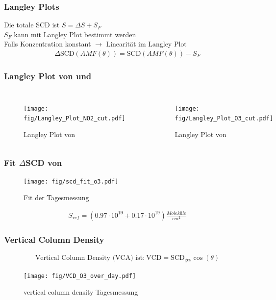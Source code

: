 \documentclass{beamer}
\begin{document}
\begin{frame}
    \frametitle{Langley Plots}
    Die totale SCD ist $S = \Delta S + S_F$\\
    $S_F$ kann mit Langley Plot bestimmt werden\\
    Falls Konzentration konstant $\to$ Linearität im Langley Plot
    \begin{align}
    	\Delta \text{SCD}(AMF(\theta)) = \text{SCD}(AMF(\theta)) - S_F
    \end{align}
\end{frame}

\begin{frame}
    \frametitle{Langley Plot von  und }
    \begin{columns}
        \begin{figure}
    		\texttt{[image: fig/Langley\_Plot\_NO2\_cut.pdf]}
            \caption{Langley Plot von }   
	 	\end{figure}
 	    \begin{figure}
 	    	\texttt{[image: fig/Langley\_Plot\_O3\_cut.pdf]}
 	        \caption{Langley Plot von }
     	\end{figure} 
    \end{columns} 	
\end{frame}

\begin{frame}
    \frametitle{Fit $\Delta$SCD von }
    \begin{figure}
    	\texttt{[image: fig/scd\_fit\_o3.pdf]}
    	\caption{Fit der Tagesmessung }
    \end{figure}
	\begin{align}
		S_{ref}= (0.97 \cdot 10^{19}\pm 0.17 \cdot 10^{19}) \si{\frac{Moleküle}{cm^2}}
	\end{align}
\end{frame}

\begin{frame}
    \frametitle{Vertical Column Density }
    \begin{align}
    	\text{Vertical Column Density (VCA) ist:}\	\text{VCD} = \text{SCD}_\text{ges} \cos (\theta)
    \end{align}
    \vspace{-1cm}
    \begin{figure}
    	\texttt{[image: fig/VCD\_O3\_over\_day.pdf]}
		\caption{vertical column density Tagesmessung }    
	\end{figure}
\end{frame}
\end{document}
